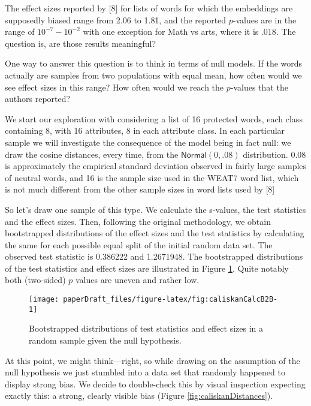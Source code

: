 \documentclass[
  10pt,
  dvipsnames,enabledeprecatedfontcommands]{scrartcl}
\begin{document}
The effect sizes reported by {[}8{]} for lists of words for which the
embeddings are supposedly biased range from 2.06 to 1.81, and the
reported \(p\)-values are in the range of \(10^{-7}-10^{-2}\) with one
exception for Math vs arts, where it is \(.018\). The question is, are
those results meaningful?

One way to answer this question is to think in terms of null models. If
the words actually are samples from two populations with equal mean, how
often would we see effect sizes in this range? How often would we reach
the \(p\)-values that the authors reported?

We start our exploration with considering a list of 16 protected words,
each class containing 8, with 16 attributes, 8 in each attribute class.
In each particular sample we will investigate the consequence of the
model being in fact null: we draw the cosine distances, every time, from
the \(\mathsf{Normal}(0,.08)\) distribution. \(0.08\) is approximately
the empirical standard deviation observed in fairly large samples of
neutral words, and 16 is the sample size used in the WEAT7 word list,
which is not much different from the other sample sizes in word lists
used by {[}8{]}

So let's draw one sample of this type. We calculate the s-values, the
test statistics and the effect sizes. Then, following the original
methodology, we obtain bootstrapped distributions of the effect sizes
and the test statistics by calculating the same for each possible equal
split of the initial random data set. The observed test statistic is
0.386222 and 1.2671948. The bootstrapped distributions of the test
statistics and effect sizes are illustrated in Figure
\ref{fig:caliskanCalc}. Quite notably both (two-sided) \(p\) values are
uneven and rather low.

\begin{figure}[H]

\begin{center}\texttt{[image: paperDraft\_files/figure-latex/fig:caliskanCalcB2B-1]} \end{center}

\caption{Bootstrapped distributions of test statistics and effect sizes in a random sample given the null hypothesis.}
\label{fig:caliskanCalc}
\end{figure}

At this point, we might think---right, so while drawing on the
assumption of the null hypothesis we just stumbled into a data set that
randomly happened to display strong bias. We decide to double-check this
by visual inspection expecting exactly this: a strong, clearly visible
bias (Figure \ref{fig:caliskanDistances}).
\end{document}
